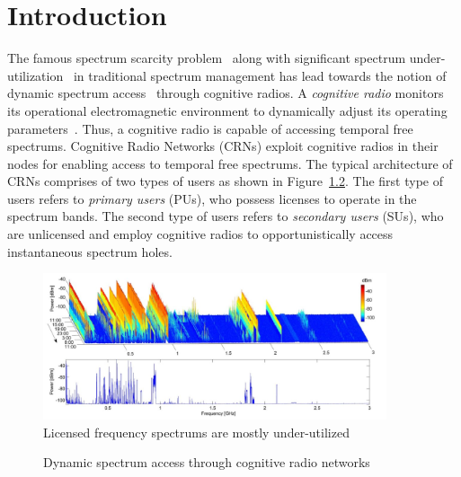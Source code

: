 \chapter{Introduction}\label{intro}
The famous spectrum scarcity problem~\cite{SpectrumScarcity} along with significant spectrum under-utilization~\cite{valenta2010survey} in traditional spectrum management has lead towards the notion of dynamic spectrum access~\cite{akyildiz2006next} through cognitive radios. A \textit{cognitive radio} monitors its operational electromagnetic environment to dynamically adjust its operating parameters~\cite{Mitola}. Thus, a cognitive radio is capable of accessing temporal free spectrums. Cognitive Radio Networks (CRNs) exploit cognitive radios in their nodes for enabling access to temporal free spectrums. The typical architecture of CRNs comprises of two types of users as shown in Figure~\ref{fig:crn}. The first type of users refers to \textit{primary users} (PUs), who possess licenses to operate in the spectrum bands. The second type of users refers to \textit{secondary users} (SUs), who are unlicensed and employ cognitive radios to opportunistically access instantaneous spectrum holes.


\begin{figure}[!htbp]
    \begin{center}
        \includegraphics[width=0.9\textwidth]{myFigures/SpectrumUnderutilization.jpg}
        \caption{Licensed frequency spectrums are mostly under-utilized~\cite{valenta2010survey}}
        \label{fig:SpectrumUnderutilization}
    \end{center}
\end{figure}

\begin{figure}[!htbp]
    \begin{center}
        
        \caption{Dynamic spectrum access through cognitive radio networks}
        \label{fig:crn}
    \end{center}
\end{figure}


